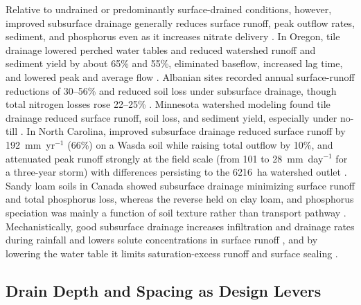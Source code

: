 Relative to undrained or predominantly surface-drained conditions, however,
improved subsurface drainage generally reduces surface runoff, peak outflow
rates, sediment, and phosphorus even as it increases nitrate delivery
\parencite{FAUSEY1995,SKAGGS1994,THOMAS1995,Gramlich2018}. In Oregon, tile
drainage lowered perched water tables and reduced watershed runoff and sediment
yield by about 65\% and 55\%, eliminated baseflow, increased lag time, and
lowered peak and average flow \parencite{ISTOK1983}. Albanian sites recorded
annual surface-runoff reductions of 30--56\% and reduced soil loss under
subsurface drainage, though total nitrogen losses rose 22--25\%
\parencite{Grazhdani1996}. Minnesota watershed modeling found tile drainage
reduced surface runoff, soil loss, and sediment yield, especially under no-till
\parencite{Maalim2013}. In North Carolina, improved subsurface drainage reduced
surface runoff by 192~mm~yr$^{-1}$ (66\%) on a Wasda soil while raising total
outflow by 10\%, and attenuated peak runoff strongly at the field scale (from
101 to 28~mm~day$^{-1}$ for a three-year storm) with differences persisting to
the 6216~ha watershed outlet \parencite{KONYHA1992}. Sandy loam soils in Canada
showed subsurface drainage minimizing surface runoff and total phosphorus loss,
whereas the reverse held on clay loam, and phosphorus speciation was mainly a
function of soil texture rather than transport pathway
\parencite{Eastman2010}. Mechanistically, good subsurface drainage increases
infiltration and drainage rates during rainfall and lowers solute concentrations
in surface runoff \parencite{Tong2016,Tao2017}, and by lowering the water table
it limits saturation-excess runoff and surface sealing \parencite{Augeard2005}.

\subsection{Drain Depth and Spacing as Design Levers}

